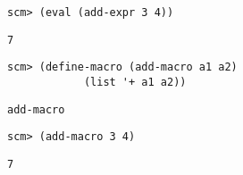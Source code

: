 \begin{blocksection}

\begin{lstlisting}
scm> (eval (add-expr 3 4))
\end{lstlisting}
\begin{solution}[.25in]
\texttt{7}
\end{solution}

\begin{lstlisting}
scm> (define-macro (add-macro a1 a2)
            (list '+ a1 a2))
\end{lstlisting}
\begin{solution}[.25in]
\texttt{add-macro}
\end{solution}

\begin{lstlisting}
scm> (add-macro 3 4)
\end{lstlisting}
 \begin{solution}[.in]
\texttt{7}
\end{solution}
\end{blocksection}

